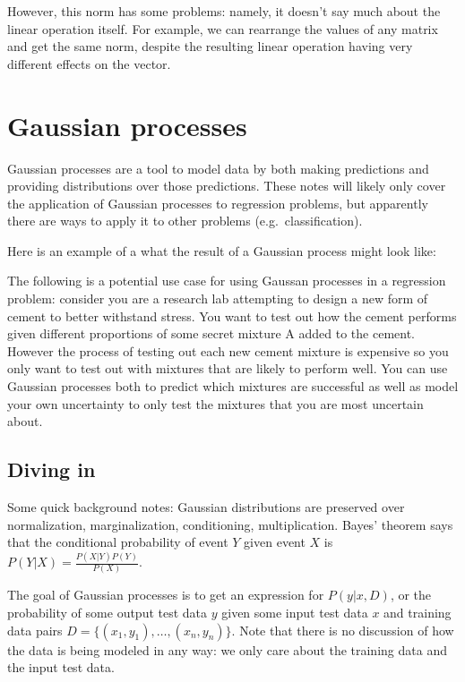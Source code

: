 \documentclass[answers,12pt]{exam}
\begin{document}
However, this norm has some problems: namely, it doesn't say much about the linear operation itself.
For example, we can rearrange the values of any matrix and get the same norm, despite the resulting linear operation having very different effects on the vector.

\section{Gaussian processes}
Gaussian processes are a tool to model data by both making predictions and providing distributions over those predictions.
These notes will likely only cover the application of Gaussian processes to regression problems, but apparently there are ways to apply it to other problems (e.g.\ classification).

Here is an example of a what the result of a Gaussian process might look like:


The following is a potential use case for using Gaussan processes in a regression problem:
consider you are a research lab attempting to design a new form of cement to better withstand stress.
You want to test out how the cement performs given different proportions of some secret mixture A added to the cement.
However the process of testing out each new cement mixture is expensive so you only want to test out with mixtures that are likely to perform well.
You can use Gaussian processes both to predict which mixtures are successful as well as model your own uncertainty to only test the mixtures that you are most uncertain about.


\subsection{Diving in}
Some quick background notes:
Gaussian distributions are preserved over normalization, marginalization, conditioning, multiplication.
Bayes' theorem says that the conditional probability of event $Y$ given event $X$ is $P(Y|X)=\frac{P(X|Y)P(Y)}{P(X)}$.

The goal of Gaussian processes is to get an expression for $P(y|x,D)$, or the probability of some output test data $y$ given some input test data $x$ and training data pairs $D = \{(x_1, y_1), \dots , (x_n,y_n)\}$.
Note that there is no discussion of how the data is being modeled in any way: we only care about the training data and the input test data.
\end{document}
